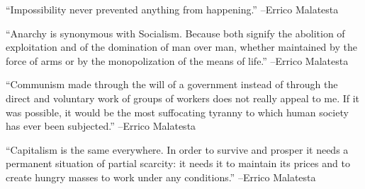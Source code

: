 \documentclass{article}%
\begin{document}
\linebreak%
\vspace{1mm}%
\begin{minipage}{\textwidth}%
\flushleft%
“Impossibility never prevented anything from happening.”%
\linebreak%
\vspace{1mm}%
–Errico Malatesta%
\linebreak%
\vspace{1mm}%
\end{minipage}%
\linebreak%
\vspace{1mm}%
\begin{minipage}{\textwidth}%
\flushleft%
“Anarchy is synonymous with Socialism. Because both signify the abolition of exploitation and of the domination of man over man, whether maintained by the force of arms or by the monopolization of the means of life.”%
\linebreak%
\vspace{1mm}%
–Errico Malatesta%
\linebreak%
\vspace{1mm}%
\end{minipage}%
\linebreak%
\vspace{1mm}%
\begin{minipage}{\textwidth}%
\flushleft%
“Communism made through the will of a government instead of through the direct and voluntary work of groups of workers does not really appeal to me. If it was possible, it would be the most suffocating tyranny to which human society has ever been subjected.”%
\linebreak%
\vspace{1mm}%
–Errico Malatesta%
\linebreak%
\vspace{1mm}%
\end{minipage}%
\linebreak%
\vspace{1mm}%
\begin{minipage}{\textwidth}%
\flushleft%
“Capitalism is the same everywhere. In order to survive and prosper it needs a permanent situation of partial scarcity: it needs it to maintain its prices and to create hungry masses to work under any conditions.”%
\linebreak%
\vspace{1mm}%
–Errico Malatesta%
\linebreak%
\vspace{1mm}%
\end{minipage}%
\end{document}
